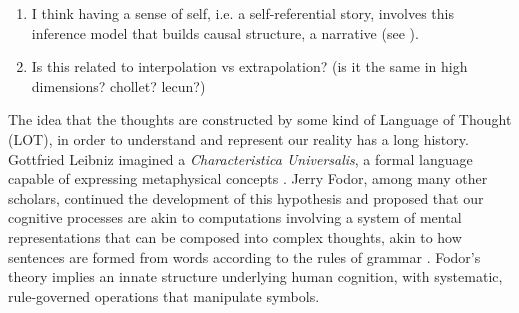 





\begin{enumerate}
    \item I think having a sense of self, i.e. a self-referential story, involves this inference model that builds causal structure, a narrative (see \cite{bouizegarene_narrative_2020}).
    \item Is this related to interpolation vs extrapolation? (is it the same in high dimensions? chollet? lecun?)
\end{enumerate}










The idea that the thoughts are constructed by some kind of Language of Thought (LOT), in order to understand and represent our reality has a long history. 
Gottfried Leibniz imagined a \textit{Characteristica Universalis}, a formal language capable of expressing metaphysical concepts \cite{sep-leibniz-logic-influence}.
Jerry Fodor, among many other scholars, continued the development of this hypothesis and proposed that our cognitive processes are akin to computations involving a system of mental representations that can be composed into complex thoughts, akin to how sentences are formed from words according to the rules of grammar \cite{sep-language-thought}. Fodor's theory implies an innate structure underlying human cognition, with systematic, rule-governed operations that manipulate symbols.


